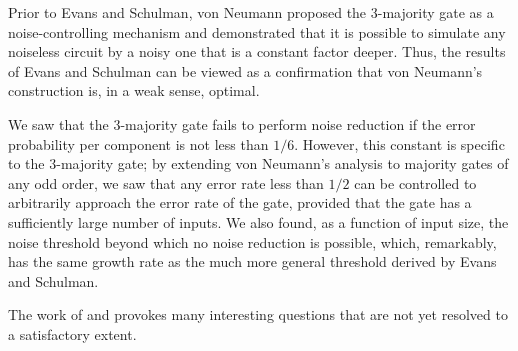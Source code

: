 \documentclass[12pt,reqno]{amsart}
\theoremstyle{plain} %
\theoremstyle{remark}
\theoremstyle{definition}
\begin{document}
Prior to Evans and Schulman, von Neumann proposed the 3-majority gate as a noise-controlling mechanism and demonstrated that it is possible to simulate any noiseless circuit by a noisy one that is a constant factor deeper. Thus, the results of Evans and Schulman can be viewed as a confirmation that von Neumann's construction is, in a weak sense, optimal. 

We saw that the $3$-majority gate fails to perform noise reduction if the error probability per component is not less than $1/6$. However, this constant is specific to the $3$-majority gate; by extending von Neumann's analysis to majority gates of any odd order, we saw that any error rate less than $1/2$ can be controlled to arbitrarily approach the error rate of the gate, provided that the gate has a sufficiently large number of inputs. We also found, as a function of input size, the noise threshold beyond which no noise reduction is possible, which, remarkably, has the same growth rate as the much more general threshold derived by Evans and Schulman.

The work of \cite{ES} and \cite{vN} provokes many interesting questions that are not yet resolved to a satisfactory extent.
\end{document}
